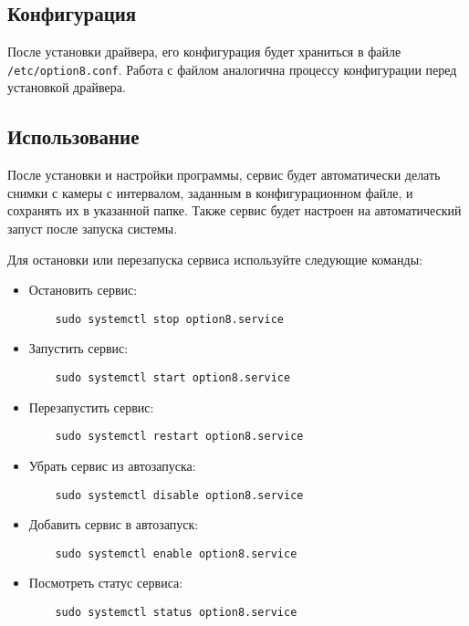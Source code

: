 \documentclass[12pt]{article}
\begin{document}
\subsection*{Конфигурация}

После установки драйвера, его конфигурация будет храниться в файле \texttt{/etc/option8.conf}. Работа с файлом аналогична процессу конфигурации перед установкой драйвера.

\subsection*{Использование}

После установки и настройки программы, сервис будет автоматически делать снимки с камеры с интервалом, заданным в конфигурационном файле, и сохранять их в указанной папке. Также сервис будет настроен на автоматический запуст после запуска системы.

Для остановки или перезапуска сервиса используйте следующие команды:
\begin{itemize}
    \item Остановить сервис:
    \begin{verbatim}
    sudo systemctl stop option8.service
    \end{verbatim}

    \item Запустить сервис:
    \begin{verbatim}
    sudo systemctl start option8.service
    \end{verbatim}

    \item Перезапустить сервис:
    \begin{verbatim}
    sudo systemctl restart option8.service
    \end{verbatim}

    \item Убрать сервис из автозапуска:
    \begin{verbatim}
    sudo systemctl disable option8.service
    \end{verbatim}

    \newpage

    \item Добавить сервис в автозапуск:
    \begin{verbatim}
    sudo systemctl enable option8.service
    \end{verbatim}

    \item Посмотреть статус сервиса:
    \begin{verbatim}
    sudo systemctl status option8.service
    \end{verbatim}

\end{itemize}
\end{document}
